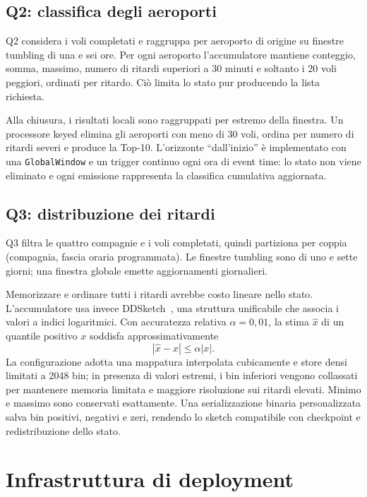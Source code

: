 \documentclass[conference]{IEEEtran}
\begin{document}
\subsection{Q2: classifica degli aeroporti}
Q2 considera i voli completati e raggruppa per aeroporto di origine su finestre tumbling di una e sei ore. Per ogni aeroporto l'accumulatore mantiene conteggio, somma, massimo, numero di ritardi superiori a 30 minuti e soltanto i 20 voli peggiori, ordinati per ritardo. Ciò limita lo stato pur producendo la lista richiesta.

Alla chiusura, i risultati locali sono raggruppati per estremo della finestra. Un processore keyed elimina gli aeroporti con meno di 30 voli, ordina per numero di ritardi severi e produce la Top-10. L'orizzonte ``dall'inizio'' è implementato con una \texttt{GlobalWindow} e un trigger continuo ogni ora di event time: lo stato non viene eliminato e ogni emissione rappresenta la classifica cumulativa aggiornata.

\subsection{Q3: distribuzione dei ritardi}
Q3 filtra le quattro compagnie e i voli completati, quindi partiziona per coppia (compagnia, fascia oraria programmata). Le finestre tumbling sono di uno e sette giorni; una finestra globale emette aggiornamenti giornalieri.

Memorizzare e ordinare tutti i ritardi avrebbe costo lineare nello stato. L'accumulatore usa invece DDSketch~\cite{masson2019ddsketch}, una struttura unificabile che associa i valori a indici logaritmici. Con accuratezza relativa $\alpha=0{,}01$, la stima $\hat{x}$ di un quantile positivo $x$ soddisfa approssimativamente
\begin{equation}
    |\hat{x}-x| \leq \alpha |x|.
\end{equation}
La configurazione adotta una mappatura interpolata cubicamente e store densi limitati a 2048 bin; in presenza di valori estremi, i bin inferiori vengono collassati per mantenere memoria limitata e maggiore risoluzione sui ritardi elevati. Minimo e massimo sono conservati esattamente. Una serializzazione binaria personalizzata salva bin positivi, negativi e zeri, rendendo lo sketch compatibile con checkpoint e redistribuzione dello stato.

\section{Infrastruttura di deployment}\label{sec:deployment}
\end{document}
